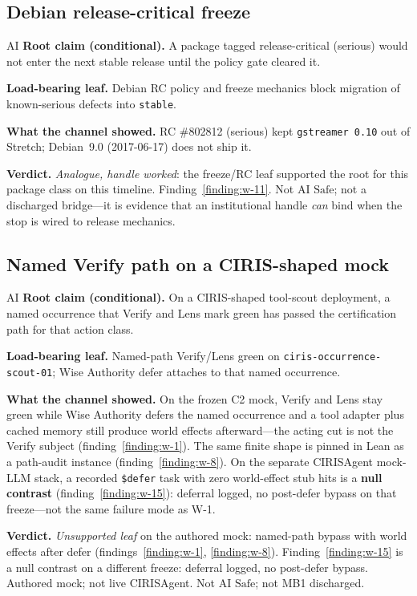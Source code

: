 \subsection{Debian release-critical freeze}
\label{sec:appn-reading-w11}
\begin{authbar}{AI}
\textbf{Root claim (conditional).} A package tagged release-critical (serious) would not enter the next stable release until the policy gate cleared it.

\textbf{Load-bearing leaf.} Debian RC policy and freeze mechanics block migration of known-serious defects into \texttt{stable}.

\textbf{What the channel showed.} RC \#802812 (serious) kept \texttt{gstreamer 0.10} out of Stretch; Debian~9.0 (2017-06-17) does not ship it.

\textbf{Verdict.} \emph{Analogue, handle worked}: the freeze/RC leaf supported the root for this package class on this timeline.
Finding~\ref{finding:w-11}.
Not AI \(\mathrm{Safe}\); not a discharged bridge---it is evidence that an institutional handle \emph{can} bind when the stop is wired to release mechanics.

\end{authbar}
\authbarsubneedspace
\subsection{Named Verify path on a CIRIS-shaped mock}
\label{sec:appn-reading-w1}
\begin{authbar}{AI}
\textbf{Root claim (conditional).} On a CIRIS-shaped tool-scout deployment, a named occurrence that Verify and Lens mark green has passed the certification path for that action class.

\textbf{Load-bearing leaf.} Named-path Verify/Lens green on \texttt{ciris-occurrence-scout-01}; Wise Authority defer attaches to that named occurrence.

\textbf{What the channel showed.} On the frozen C2 mock, Verify and Lens stay green while Wise Authority defers the named occurrence and a tool adapter plus cached memory still produce world effects afterward---the acting cut is not the Verify subject (finding~\ref{finding:w-1}).
The same finite shape is pinned in Lean as a path-audit instance (finding~\ref{finding:w-8}).
On the separate CIRISAgent mock-LLM stack, a recorded \texttt{\$defer} task with zero world-effect stub hits is a \textbf{null contrast} (finding~\ref{finding:w-15}): deferral logged, no post-defer bypass on that freeze---not the same failure mode as W-1.

\textbf{Verdict.} \emph{Unsupported leaf} on the authored mock: named-path bypass with world effects after defer (findings~\ref{finding:w-1}, \ref{finding:w-8}).
Finding~\ref{finding:w-15} is a null contrast on a different freeze: deferral logged, no post-defer bypass.
Authored mock; not live CIRISAgent.
Not AI \(\mathrm{Safe}\); not MB1 discharged.

\end{authbar}

